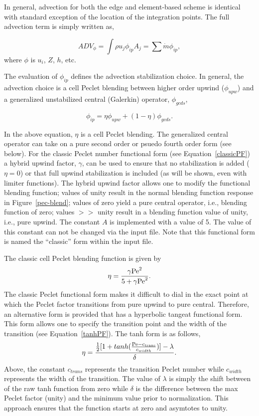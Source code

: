 In general, advection for both the edge and element-based
scheme is identical with standard exception of the location of the integration
points. The full advection term is simply written as,

\begin{equation}
  ADV_{\phi} = \int \rho u_j \phi_{ip} A_j = \sum \dot{m} \phi_{ip},
\label{advForm}
\end{equation}
%
where $\phi$ is $u_i$, $Z$, $h$, etc.

The evaluation of $\phi_{ip}$ defines the advection stabilization choice. 
In general, the advection choice is a cell Peclet blending between higher
order upwind ($\phi_{upw}$) and a generalized unstabilized central 
(Galerkin) operator, $\phi_{gcds}$,

\begin{equation}
  \phi_{ip} = \eta \phi_{upw} + (1-\eta)\phi_{gcds}.
\end{equation}
\label{advPhiIP}
%

In the above equation, $\eta$ is a cell Peclet blending. The generalized
central operator can take on a pure second order or psuedo fourth order form (see below). 
For the classic Peclet number functional form (see Equation~\ref{classicPF}) 
a hybrid upwind factor, $\gamma$, can be used to 
ensure that no stabilization is added ($\eta = 0$) or that full upwind stabilization is included (as will be shown, 
even with limiter functions). The hybrid upwind factor allows one to modify the functional
blending function; values of unity result in the normal blending function 
response in  Figure~\ref{pec-blend}; values of zero yield
a pure central operator, i.e., blending function of zero; values $>>$ unity result 
in a blending function value of unity, i.e., pure upwind. The constant $A$
is implemented with a value of 5. The value of this constant can not be changed
via the input file. Note that this functional form is named the ``classic'' form
within the input file.

The classic cell Peclet blending function is given by
\begin{equation}
  \eta = \frac {{\gamma \rm Pe}^2} {5 + {\gamma \rm Pe}^2}.
\label{classicPF}
\end{equation}
The classic Peclet functional form makes it difficult to dial in the exact
point at which the Peclet factor transitions from pure upwind to pure central. 
Therefore, an alternative form is provided that has a hyperbolic tangeat 
functional form. This form allows one to specify the transition point and 
the width of the transition (see Equation~\ref{tanhPF}).
The tanh form is as follows,
\begin{equation}
  \eta = \frac {\frac {1}{2}[1+tanh(\frac{\rm Pe - c_{trans}}{c_{width}})] -\lambda}{\delta}.
\label{tanhPF}
\end{equation}
Above, the constant $c_{trans}$ represents the transition Peclet number while $c_{width}$ represents the width of 
the transition. The value of $\lambda$ is simply the shift between of the raw tanh function
from zero while $\delta$ is the difference between the max Peclet factor (unity) and the minimum value
prior to normalization. This approach ensures that the function starts at zero and asymtotes to unity. 

